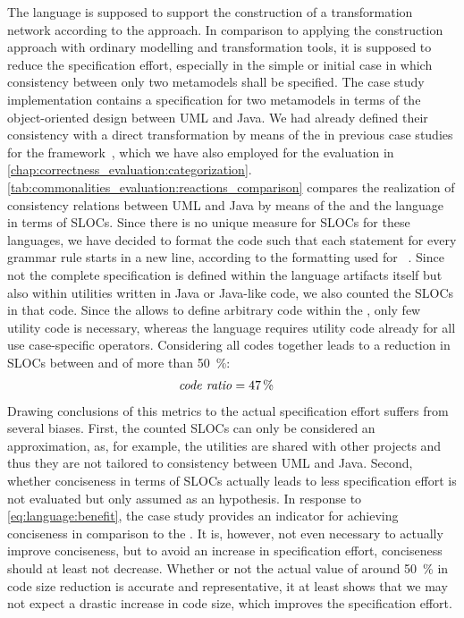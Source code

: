 The \commonalities language is supposed to support the construction of a transformation network according to the \commonalities approach.
In comparison to applying the construction approach with ordinary modelling and transformation tools, it is supposed to reduce the specification effort, especially in the simple or initial case in which consistency between only two metamodels shall be specified.
The case study implementation contains a specification for two metamodels in terms of the object-oriented design \commonalities between \gls{UML} and Java.
We had already defined their consistency with a direct transformation by means of the \reactionslanguage in previous case studies for the \vitruv framework~, which we have also employed for the evaluation in \autoref{chap:correctness_evaluation:categorization}.
\autoref{tab:commonalities_evaluation:reactions_comparison} compares the realization of consistency relations between \gls{UML} and Java by means of the \reactionslanguage and the \commonalities language in terms of \glspl{SLOC}.
Since there is no unique measure for \glspl{SLOC} for these languages, we have decided to format the code such that each statement for every grammar rule starts in a new line, according to the formatting used for \reactions~.
Since not the complete specification is defined within the language artifacts itself but also within utilities written in Java or Java-like code, we also counted the \glspl{SLOC} in that code.
Since the \reactionslanguage allows to define arbitrary code within the \reactions, only few utility code is necessary, whereas the \commonalities language requires utility code already for all use case-specific operators.
Considering all codes together leads to a reduction in \glspl{SLOC} between \reactions and \commonalities of more than \SI{50}{\percent}:
\begin{align*}
    &
    \mathit{code\ ratio} = \SI{47}{\percent}
\end{align*}
Drawing conclusions of this metrics to the actual specification effort suffers from several biases.
First, the counted \glspl{SLOC} can only be considered an approximation, as, for example, the utilities are shared with other projects and thus they are not tailored to consistency between \gls{UML} and Java.
Second, whether conciseness in terms of \glspl{SLOC} actually leads to less specification effort is not evaluated but only assumed as an hypothesis.
In response to \autoref{eq:language:benefit}, the case study provides an indicator for achieving conciseness in comparison to the \reactionslanguage.
It is, however, not even necessary to actually improve conciseness, but to avoid an increase in specification effort, conciseness should at least not decrease.
Whether or not the actual value of around \SI{50}{\percent} in code size reduction is accurate and representative, it at least shows that we may not expect a drastic increase in code size, which improves the specification effort.



